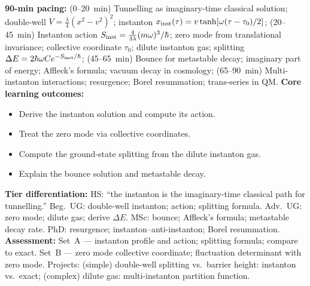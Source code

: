 \documentclass[11pt,a4paper]{article}
\begin{document}
\begin{tcolorbox}[modulebox, title={Module~II.2 --- Lecture L08: Instantons and Quantum Tunnelling}]
\textbf{90-min pacing:} (0--20~min) Tunnelling as imaginary-time classical solution; double-well $V=\tfrac{\lambda}{4}(x^2-v^2)^2$; instanton $x_{\rm inst}(\tau)=v\tanh[\omega(\tau-\tau_0)/2]$; (20--45~min) Instanton action $S_{\rm inst}=\tfrac{4}{3\lambda}(m\omega)^3/\hbar$; zero mode from translational invariance; collective coordinate $\tau_0$; dilute instanton gas; splitting $\Delta E=2\hbar\omega C e^{-S_{\rm inst}/\hbar}$; (45--65~min) Bounce for metastable decay; imaginary part of energy; Affleck's formula; vacuum decay in cosmology; (65--90~min) Multi-instanton interactions; resurgence; Borel resummation; trans-series in QM.
\medskip\textbf{Core learning outcomes:}
\begin{itemize}[leftmargin=1.4em,topsep=2pt,itemsep=1pt]
  \item Derive the instanton solution and compute its action.
  \item Treat the zero mode via collective coordinates.
  \item Compute the ground-state splitting from the dilute instanton gas.
  \item Explain the bounce solution and metastable decay.
\end{itemize}
\medskip\textbf{Tier differentiation:}
HS: ``the instanton is the imaginary-time classical path for tunnelling.''
Beg.\ UG: double-well instanton; action; splitting formula.
Adv.\ UG: zero mode; dilute gas; derive $\Delta E$.
MSc: bounce; Affleck's formula; metastable decay rate.
PhD: resurgence; instanton--anti-instanton; Borel resummation.
\medskip\textbf{Assessment:}
Set~A --- instanton profile and action; splitting formula; compare to exact.
Set~B --- zero mode collective coordinate; fluctuation determinant with zero mode.
Projects: (simple) double-well splitting vs.\ barrier height: instanton vs.\ exact; (complex) dilute gas: multi-instanton partition function.
\end{tcolorbox}

\medskip
\end{document}
